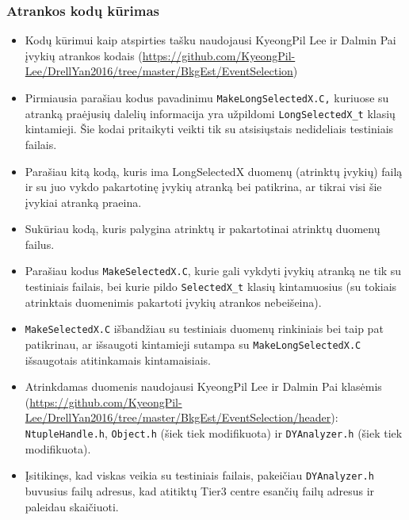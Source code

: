 \documentclass{beamer}
\begin{document}
\begin{frame}[allowframebreaks]
\frametitle{Atrankos kodų kūrimas}

\begin{itemize}
	\item Kodų kūrimui kaip atspirties tašku naudojausi KyeongPil Lee ir Dalmin Pai įvykių atrankos kodais (\url{https://github.com/KyeongPil-Lee/DrellYan2016/tree/master/BkgEst/EventSelection})
	\item Pirmiausia parašiau kodus pavadinimu \texttt{MakeLongSelectedX.C,} kuriuose su atranką praėjusių dalelių informacija yra užpildomi \texttt{LongSelectedX\_t} klasių kintamieji. Šie kodai pritaikyti veikti tik su atsisiųstais nedideliais testiniais failais.
	\item Parašiau kitą kodą, kuris ima LongSelectedX duomenų (atrinktų įvykių) failą ir su juo vykdo pakartotinę įvykių atranką bei patikrina, ar tikrai visi šie įvykiai atranką praeina.
	\item Sukūriau kodą, kuris palygina atrinktų ir pakartotinai atrinktų duomenų failus.
	\item Parašiau kodus \texttt{MakeSelectedX.C}, kurie gali vykdyti įvykių atranką ne tik su testiniais failais, bei kurie pildo \texttt{SelectedX\_t} klasių kintamuosius (su tokiais atrinktais duomenimis pakartoti įvykių atrankos nebeišeina).
	\item \texttt{MakeSelectedX.C} išbandžiau su testiniais duomenų rinkiniais bei taip pat patikrinau, ar išsaugoti kintamieji sutampa su \texttt{MakeLongSelectedX.C} išsaugotais atitinkamais kintamaisiais.
	\item Atrinkdamas duomenis naudojausi KyeongPil Lee ir Dalmin Pai klasėmis (\url{https://github.com/KyeongPil-Lee/DrellYan2016/tree/master/BkgEst/EventSelection/header}): \texttt{NtupleHandle.h}, \texttt{Object.h} (šiek tiek modifikuota) ir \texttt{DYAnalyzer.h} (šiek tiek modifikuota).
	\item Įsitikinęs, kad viskas veikia su testiniais failais, pakeičiau \texttt{DYAnalyzer.h} buvusius failų adresus, kad atitiktų Tier3 centre esančių failų adresus ir paleidau skaičiuoti.
\end{itemize}

\end{frame}
\end{document}
